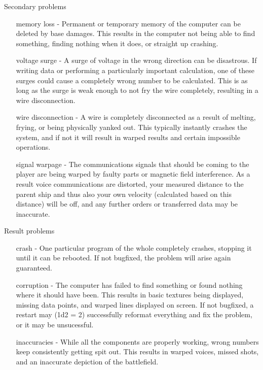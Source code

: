 \documentclass[a4paper]{article}
\begin{document}
\vspace{0.2cm}
Secondary problems
\begin{enumerate}[leftmargin=4cm]
\item [memory loss] - Permanent or temporary memory of the computer can be deleted by base damages. This results in the computer not being able to find something, finding nothing when it does, or straight up crashing.
\item [voltage surge] - A surge of voltage in the wrong direction can be disastrous. If writing data or performing a particularly important calculation, one of these surges could cause a completely wrong number to be calculated. This is as long as the surge is weak enough to not fry the wire completely, resulting in a wire disconnection.
\item [wire disconnection] - A wire is completely disconnected as a result of melting, frying, or being physically yanked out. This typically instantly crashes the system, and if not it will result in warped results and certain impossible operations.
\item [signal warpage] - The communications signals that should be coming to the player are being warped by faulty parts or magnetic field interference. As a result voice communications are distorted, your measured distance to the parent ship and thus also your own velocity (calculated based on this distance) will be off, and any further orders or transferred data may be inaccurate.
\end{enumerate}


\vspace{0.2cm}
Result problems
\begin{enumerate}[leftmargin=4cm]
\item [crash] - One particular program of the whole completely crashes, stopping it until it can be rebooted. If not bugfixed, the problem will arise again guaranteed.
\item [corruption] - The computer has failed to find something or found nothing where it should have been. This results in basic textures being displayed, missing data points, and warped lines displayed on screen. If not bugfixed, a restart may (1d2 = 2) successfully reformat everything and fix the problem, or it may be unsucessful.
\item [inaccuracies] - While all the components are properly working, wrong numbers keep consistently getting spit out. This results in warped voices, missed shots, and an inaccurate depiction of the battlefield.
\end{enumerate}
\end{document}
